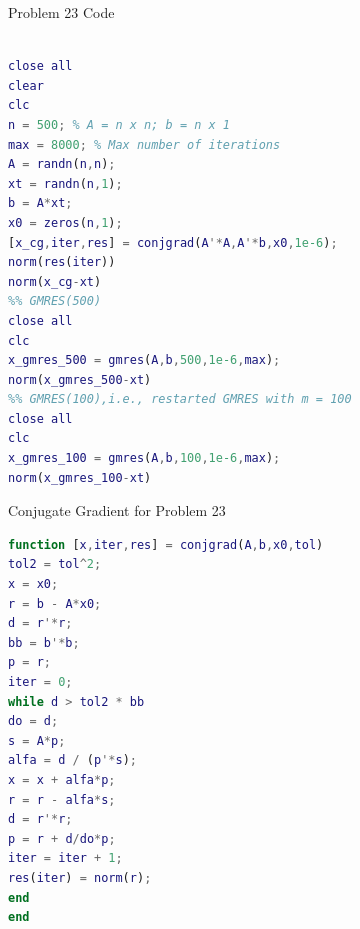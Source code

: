 \documentclass[12pt]{article}
\begin{document}
\large{Problem 23 Code}
\begin{lstlisting}[language=MATLAB]
%% CG on the normal equations

close all
clear
clc
n = 500; % A = n x n; b = n x 1
max = 8000; % Max number of iterations
A = randn(n,n);
xt = randn(n,1);
b = A*xt;
x0 = zeros(n,1);
[x_cg,iter,res] = conjgrad(A'*A,A'*b,x0,1e-6);
norm(res(iter))
norm(x_cg-xt)
%% GMRES(500)
close all
clc
x_gmres_500 = gmres(A,b,500,1e-6,max);
norm(x_gmres_500-xt)
%% GMRES(100),i.e., restarted GMRES with m = 100
close all
clc
x_gmres_100 = gmres(A,b,100,1e-6,max);
norm(x_gmres_100-xt)
\end{lstlisting}

\large{Conjugate Gradient for Problem 23}
\begin{lstlisting}[language=MATLAB]
function [x,iter,res] = conjgrad(A,b,x0,tol)
tol2 = tol^2;
x = x0;
r = b - A*x0;
d = r'*r; 
bb = b'*b;
p = r;
iter = 0;
while d > tol2 * bb
do = d;
s = A*p;
alfa = d / (p'*s);
x = x + alfa*p;
r = r - alfa*s;
d = r'*r;
p = r + d/do*p;
iter = iter + 1;
res(iter) = norm(r);
end
end
\end{lstlisting}
\end{document}
